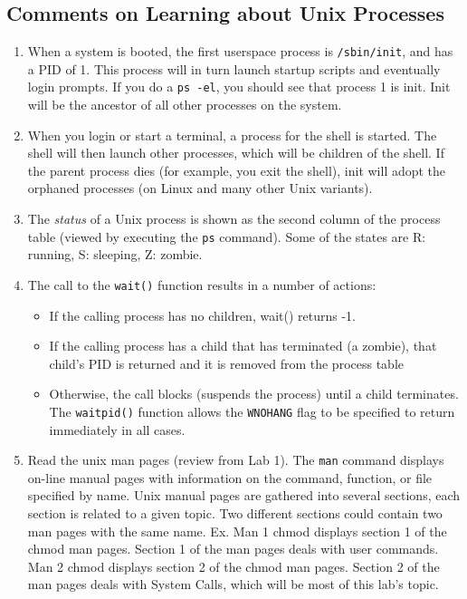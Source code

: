 \documentclass[letterpaper,10pt]{article}
\newcommand{\cmd}[1]{\texttt{#1}}
\begin{document}
\subsection{Comments on Learning about Unix Processes}
\begin{enumerate}
 \item When a system is booted, the first userspace process is \cmd{/sbin/init}, and has a PID of 1.
This process will in turn launch startup scripts and eventually login prompts. If you do a
\cmd{ps -el}, you should see that process 1 is init. Init will be the ancestor of all other processes on
the system.
 \item When you login or start a terminal, a process for the shell is started. The shell will then launch other processes, which will be children of the shell. If the parent process dies (for example, you exit the shell), init will adopt the orphaned processes (on Linux and many other Unix variants).
 \item The \emph{status} of a Unix process is shown as the second column of the process table (viewed
by executing the \cmd{ps} command). Some of the states are R: running, S: sleeping, Z: zombie.
 \item The call to the \cmd{wait()} function results in a number of actions:
 \begin{itemize}
  \item If the calling process has no children, wait() returns -1.
  \item If the calling process has a child that has terminated (a zombie), that child's PID is returned
    and it is removed from the process table
  \item Otherwise, the call blocks (suspends the process) until a child terminates. The \cmd{waitpid()} function allows the \cmd{WNOHANG} flag to be specified to return immediately in all cases.
 \end{itemize}
 \item Read the unix man pages (review from Lab 1). The \cmd{man} command displays on-line manual pages with
information on the command, function, or file specified by name. Unix manual pages are
gathered into several sections, each section is related to a given topic. Two different sections
could contain two man pages with the same name. Ex. Man 1 chmod displays section 1 of the
chmod man pages. Section 1 of the man pages deals with user commands. Man 2 chmod
displays section 2 of the chmod man pages. Section 2 of the man pages deals with System
Calls, which will be most of this lab's topic.
\end{enumerate}
\end{document}
